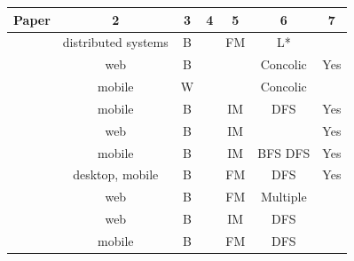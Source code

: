 \begin{table}
	\begin{tabular}{| c | c | c | c | c | c | c |}

		\hline

		Paper &2& 3 & 4& 5 & 6 & 7 	\\
		\hline


		\cite{hungar2002}                       &distributed systems   &B  &  &FM&L*       & \\


		\cite{5416728}                          &web                    &B  &  &  &Concolic & Yes \\

		\cite{concolicandroid12}                &mobile                 &W  &  &  &Concolic & 					\\

		\cite{Joorabchi:2012:REI:2420240.2420457}                    &mobile                 &B  &  &IM &DFS		& Yes 			 		\\

		\cite{webmate12}                        &web                    &B  &  &IM &         & Yes \\


		\cite{5954416,Amalfitano:2012:UGR:2351676.2351717}     &mobile                 &B  &  &IM &BFS DFS 	& Yes	\\

		\cite{guitar,MobiGUITARIEEESoftware2014}          &desktop, mobile        &B	&  &FM &DFS		& Yes  \\

		\cite{crawljax:tweb12}                  &web                    &B	&  &FM&Multiple &	\\

		\cite{4656395}                          &web                    &B 	&  &IM &DFS 		&   \\

		\cite{Choi2013}                         &mobile                 &B  &  &FM&DFS      &   \\


\end{tabular}
\end{table}

